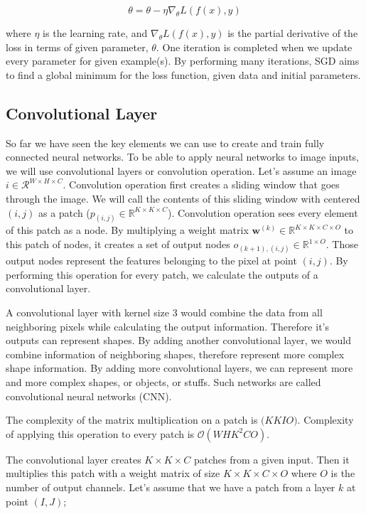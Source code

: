 $$ \theta = \theta- \eta \nabla_\theta{L(f(x), y)} $$

where $\eta$ is the learning rate, and $\nabla_\theta{L(f(x), y)}$ is the partial derivative of the loss in terms of given parameter, $\theta$. One iteration is completed when we update every parameter for given example(s). By performing many iterations, SGD aims to find a global minimum for the loss function, given data and initial parameters.

\subsection{Convolutional Layer}
So far we have seen the key elements we can use to create and train fully connected neural networks. To be able to apply neural networks to image inputs, we will use convolutional layers or convolution operation. Let's assume an image $i \in \mathcal{R}^{W \times H \times C}$. Convolution operation first creates a sliding window that goes through the image. We will call the contents of this sliding window with centered $(i,j)$ as a patch ($p_{(i,j)} \in \mathbb{R}^{K \times K \times C}$). Convolution operation sees every element of this patch as a node. By multiplying a weight matrix $\mathbf{w}^{(k)} \in \mathbb{R}^{K \times K \times C \times O}$ to this patch of nodes, it creates a set of output nodes $o_{(k+1),(i,j)} \in \mathbb{R}^{1 \times O}$. Those output nodes represent the features belonging to the pixel at point $(i,j)$. By performing this operation for every patch, we calculate the outputs of a convolutional layer. 

A convolutional layer with kernel size 3 would combine the data from all neighboring pixels while calculating the output information. Therefore it's outputs can represent shapes. By adding another convolutional layer, we would combine information of neighboring shapes, therefore represent more complex shape information. By adding more convolutional layers, we can represent more and more complex shapes, or objects, or stuffs. Such networks are called convolutional neural networks (CNN). 

The complexity of the matrix multiplication on a patch is $\mathcal(KKIO)$. Complexity of applying this operation to every patch is $\mathcal{O}(WHK^2CO)$. 


\iffalse
The convolutional layer creates $K \times K \times C$ patches from a given input. Then it multiplies this patch with a weight matrix of size $K \times K \times C \times O$ where $O$ is the number of output channels. Let's assume that we have a patch from a layer $k$ at point $(I, J)$; 

